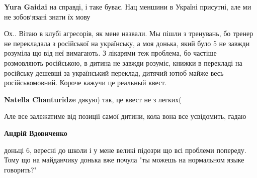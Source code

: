 \begin{itemize}
\begin{itemize}
 
\textbf{Yura Gaidai} на справді, і таке буває. Нац меншини в Україні присутні, але ми не зобов‘язані знати їх мову
\end{itemize}

 

Ох.. Вітаю в клубі агресорів, як мене назвали. Мы пішли з тренувань, бо тренер
не перекладала з російської на українську, а моя донька, який було 5 не завжди
розуміла що від неї вимагають. З лікарями теж проблема, бо частіше розмовляють
російською, в дитина не завжди розуміє, книжки в перекладі на російську дешевші
за український переклад, дитячий ютюб майже весь російськомовний. Короче кажучи
це реальный квест.

\begin{itemize}
 
\textbf{Natella Chanturidze} дякую)
так, це квест не з легких(

Але все залежатиме від позиції самої дитини, кола вона все усвідомить, гадаю

 
\textbf{Андрій Вдовиченко} 

доньці 6, вересні до школи і у мене великі підозри що всі проблеми попереду.
Тому що на майданчику донька вже почула "ты можешь на нормальном языке
говорить?"


 

\end{itemize}
\end{itemize}
